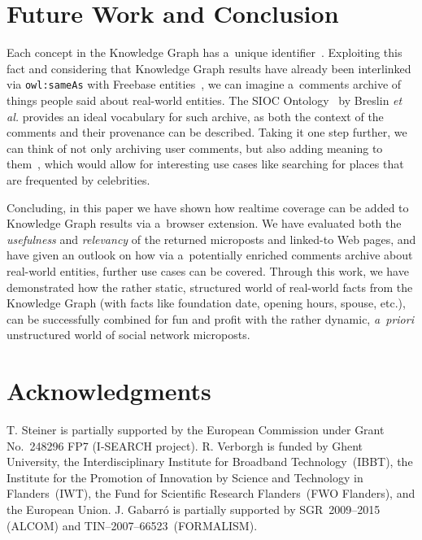\documentclass[runningheads,a4paper]{llncs}
\begin{document}
\section{Future Work and Conclusion}
Each concept in the Knowledge Graph has a~unique identifier~\cite{thalhammer2012}.
Exploiting this fact and considering that Knowledge Graph results
have already been interlinked via \texttt{owl:sameAs}
with Freebase entities~\cite{glaser2012},
we can imagine a~comments archive of things people said about real-world entities.
The SIOC Ontology~\cite{breslin2005} by Breslin \emph{et al.}
provides an ideal vocabulary for such archive,
as both the context of the comments and their provenance can be described.
Taking it one step further, we can think of not only archiving user comments,
but also adding meaning to them~\cite{steiner2013},
which would allow for interesting use cases
like searching for places that are frequented by celebrities.

Concluding, in this paper we have shown how realtime coverage
can be added to Knowledge Graph results via a~browser extension.
We have evaluated both the \emph{usefulness} and \emph{relevancy}
of the returned microposts and linked-to Web pages,
and have given an outlook on how via a~potentially enriched comments archive
about real-world entities, further use cases can be covered.
Through this work, we have demonstrated how the rather static, structured world
of real-world facts from the Knowledge Graph
(with facts like foundation date, opening hours, spouse, etc.),
can be successfully combined for fun and profit
with the rather dynamic, \emph{a~priori} unstructured world
of social network microposts.

\section*{Acknowledgments}
\small
T. Steiner is partially supported by the European Commission
under Grant No.~248296 FP7 (\mbox{I-SEARCH} project).
R. Verborgh is funded by Ghent University,
the Interdisciplinary Institute for Broadband Technology~(\mbox{IBBT}),
the Institute for the Promotion of Innovation by Science and Technology in Flanders~(\mbox{IWT}),
the Fund for Scientific Research Flanders~(\mbox{FWO} Flanders), and the European Union.
J. Gabarr\'o is partially supported by \mbox{SGR}~2009--2015 (\mbox{ALCOM}) and
\mbox{TIN}--2007--66523~(\mbox{FORMALISM}).

\linespread{1}


\end{document}
